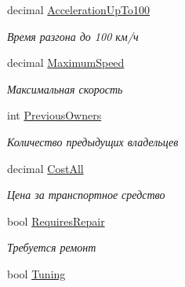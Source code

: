\begin{DoxyCompactItemize}
decimal \hyperlink{class_r_t_1_1_parsing_libs_1_1_models_1_1_automoto_additional_info_a23d33dc00ae67ce4b34bba307e5a9337}{Acceleration\+Up\+To100}
\begin{DoxyCompactList}\small\item\em Время разгона до 100 км/ч \end{DoxyCompactList}\item 
decimal \hyperlink{class_r_t_1_1_parsing_libs_1_1_models_1_1_automoto_additional_info_ad614245751a54708cb6ec4f03f3effb3}{Maximum\+Speed}
\begin{DoxyCompactList}\small\item\em Максимальная скорость \end{DoxyCompactList}\item 
int \hyperlink{class_r_t_1_1_parsing_libs_1_1_models_1_1_automoto_additional_info_a005b061dd8c2fe0f17a35b8456882b9e}{Previous\+Owners}
\begin{DoxyCompactList}\small\item\em Количество предыдущих владельцев \end{DoxyCompactList}\item 
decimal \hyperlink{class_r_t_1_1_parsing_libs_1_1_models_1_1_automoto_additional_info_a6f3d26ed5afc9827e7b1324526b307c7}{Cost\+All}
\begin{DoxyCompactList}\small\item\em Цена за транспортное средство \end{DoxyCompactList}\item 
bool \hyperlink{class_r_t_1_1_parsing_libs_1_1_models_1_1_automoto_additional_info_a6b005bcb35704765b2814ad10e8451d6}{Requires\+Repair}
\begin{DoxyCompactList}\small\item\em Требуется ремонт \end{DoxyCompactList}\item 
bool \hyperlink{class_r_t_1_1_parsing_libs_1_1_models_1_1_automoto_additional_info_ac4ba9cedc2ea0d67be2515bdb6057379}{Tuning}

\end{DoxyCompactItemize}
